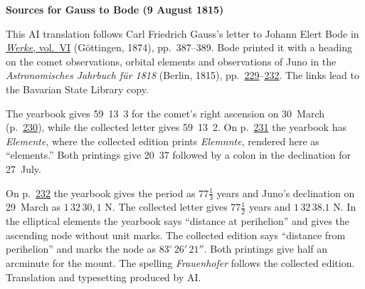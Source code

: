 \clearpage\thispagestyle{empty}
\begin{center}\textbf{Sources for Gauss to Bode (9 August 1815)}\end{center}
\noindent This AI translation follows Carl Friedrich Gauss’s letter to Johann Elert Bode in \href{https://gdz.sub.uni-goettingen.de/id/PPN236007467}{\textit{Werke}, vol.~VI} (Göttingen, 1874), pp.~387--389. Bode printed it with a heading on the comet observations, orbital elements and observations of Juno in the \textit{Astronomisches Jahrbuch für 1818} (Berlin, 1815), pp.~\href{https://api.digitale-sammlungen.de/iiif/image/v2/bsb10538347_00237/full/1600,/0/default.jpg}{229}--\href{https://api.digitale-sammlungen.de/iiif/image/v2/bsb10538347_00240/full/1600,/0/default.jpg}{232}. The links lead to the Bavarian State Library copy.
\par\smallskip\noindent The yearbook gives 59~13~3 for the comet’s right ascension on 30~March (p.~\href{https://api.digitale-sammlungen.de/iiif/image/v2/bsb10538347_00238/full/1600,/0/default.jpg}{230}), while the collected letter gives 59~13~2. On p.~\href{https://api.digitale-sammlungen.de/iiif/image/v2/bsb10538347_00239/full/1600,/0/default.jpg}{231} the yearbook has \textit{Elemente}, where the collected edition prints \textit{Elemnnte}, rendered here as “elements.” Both printings give 20~37 followed by a colon in the declination for 27~July.
\par\smallskip\noindent On p.~\href{https://api.digitale-sammlungen.de/iiif/image/v2/bsb10538347_00240/full/1600,/0/default.jpg}{232} the yearbook gives the period as $77\tfrac13$ years and Juno’s declination on 29~March as $1\,32\,30{,}1$ N. The collected letter gives $77\tfrac12$ years and $1\,32\,38.1$ N. In the elliptical elements the yearbook says “distance at perihelion” and gives the ascending node without unit marks. The collected edition says “distance from perihelion” and marks the node as $83^\circ\,26'\,21''$. Both printings give half an arcminute for the mount. The spelling \textit{Frauenhofer} follows the collected edition. Translation and typesetting produced by AI.
\clearpage
